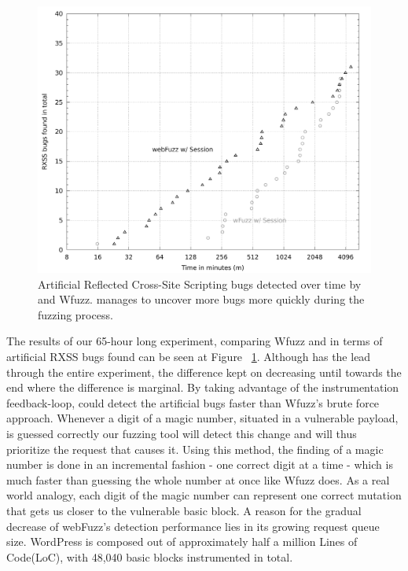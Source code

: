 \begin{figure}[!htb]
  \centering \includegraphics[width=\linewidth]{figures/plot_bugs.pdf}
  \caption{ Artificial Reflected Cross-Site Scripting bugs detected over time by \pname{} and Wfuzz. \pname{} manages to uncover more bugs more quickly during the fuzzing process.} 
  \label{fig:plot_rxss}
\end{figure}

The results of our 65-hour long experiment, comparing Wfuzz and \pname{} in terms of artificial RXSS bugs found can be seen at Figure ~\ref{fig:plot_rxss}. Although \pname{} has the lead through the entire experiment, the difference kept on decreasing until towards the end where the difference is marginal. By taking advantage of the instrumentation feedback-loop, \pname{} could detect the artificial bugs faster than Wfuzz's brute force approach. Whenever a digit of a magic
number, situated in a vulnerable payload, is guessed correctly our fuzzing tool will detect this change and will thus prioritize the request that causes it. Using this method, the finding of a magic number is done in an incremental fashion - one correct digit at a time - which is much faster than guessing the whole number at once like Wfuzz does. As a real world analogy, each digit of the magic number can represent one correct mutation that gets us closer to the vulnerable basic block. A reason for the gradual decrease of webFuzz's detection performance lies in its growing request queue size. WordPress is composed out of approximately half a million Lines of Code(LoC), with 48,040 basic blocks instrumented in total.

